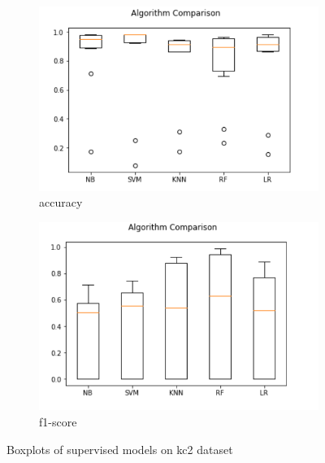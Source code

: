 \begin{figure}[h!]
  \centering
  \begin{subfigure}[b]{0.4\linewidth}
    \includegraphics[width=\linewidth]{report/kc2.png}
    \caption{accuracy}
  \end{subfigure}
  \begin{subfigure}[b]{0.4\linewidth}
    \includegraphics[width=\linewidth]{report/kc2_f.png}
    \caption{f1-score}
  \end{subfigure}
  \caption{Boxplots of supervised models on kc2 dataset}
\end{figure}

